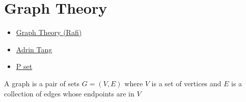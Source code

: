 \chapter{Graph Theory}%
\begin{linkb}
   \begin{itemize}
        \item \href{https://www.youtube.com/watch?v=ZXr4S48WIfY}{Graph Theory (Rafi)} 
        \item \href{https://drive.google.com/file/d/1Bx9a3svwtSh4V26o5hiTaBI9GTUsJnZg/view?usp=sharing}{Adrin Tang} 
        \item \href{https://drive.google.com/file/d/1YRNcY2ybUOOc8vldQBhBhDzPqZ_h6Mvz/view?usp=sharing}{P set}
   \end{itemize}
\end{linkb}

A graph is a pair of sets $G = (V, E)$ where $V$ is a set of vertices and $E$ is a collection of
edges whose endpoints are in $V$
\section{}


\section{}


\section{}

